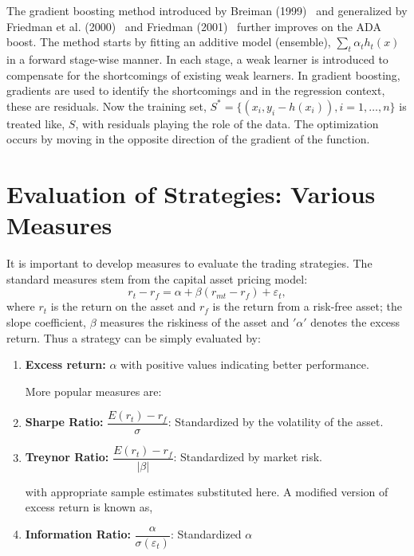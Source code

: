 The gradient boosting method introduced by Breiman (1999)~\cite{breiman1999prediction} and generalized by Friedman et al. (2000)~\cite{friedman2000additive} and Friedman (2001)~\cite{friedman2001greedy} further improves on the ADA boost. The method starts by fitting an additive model (ensemble), $\sum_t \alpha_t h_t (x)$ in a forward stage-wise manner. In each stage, a weak learner is introduced to compensate for the shortcomings of existing weak learners. In gradient boosting, gradients are used to identify the shortcomings and in the regression context, these are residuals. Now the training set, $S^*=\{ (x_i, y_i-h(x_i)) , i =1,\ldots,n \}$ is treated like, $S$, with residuals playing the role of the data. The optimization occurs by moving in the opposite direction of the gradient of the function.



\section{Evaluation of Strategies: Various Measures}


It is important to develop measures to evaluate the trading strategies. The standard measures stem from the capital asset pricing model:
	\begin{equation}
	r_{t} - r_f = \alpha + \beta (r_{mt} - r_f) + \varepsilon_{t},
	\end{equation}
where $r_t$ is the return on the asset and $r_f$ is the return from a risk-free asset; the slope coefficient, $\beta$ measures the riskiness of the asset and $'\alpha'$ denotes the excess return. Thus a strategy can be simply evaluated by: 

\begin{enumerate}[--]
\item \textbf{Excess return: }$\alpha$ with positive values indicating better performance. \twomedskip

\noindent More popular measures are: \twomedskip

\item \textbf{Sharpe Ratio: } $\dfrac{E(r_{t}) - r_f}{\sigma}$: Standardized by the volatility of the asset. \twomedskip

\item \textbf{Treynor Ratio: } $\dfrac{E(r_{t}) - r_f}{\left|\beta \right|}$: Standardized by market risk. \twomedskip

\noindent with appropriate sample estimates substituted here. A modified version of excess return is known as, \twomedskip

\item \textbf{Information Ratio: } $\dfrac{\alpha}{\sigma(\varepsilon_{t})}$: Standardized $\alpha$
\end{enumerate}



